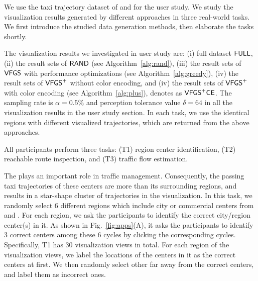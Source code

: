 We use the taxi trajectory dataset of \pt{} and \sz{} for the user study.
We study the visualization results generated by different approaches in three real-world tasks.
We first introduce the studied data generation methods, then elaborate the tasks shortly.

The visualization results we investigated in user study are: (i) full dataset $\mathsf{FULL}$,
(ii) the result sets of $\mathsf{RAND}$ (see Algorithm~\ref{alg:rand}),
(iii) the result sets of $\mathsf{VFGS}$ with performance optimizations (see Algorithm~\ref{alg:greedy}),
(iv) the result sets of $\mathsf{VFGS}^{+}$ without color encoding,
and (iv) the result sets of $\mathsf{VFGS}^{+}$ with color encoding (see Algorithm~\ref{alg:plus}), denotes as $\mathsf{VFGS}^{+}\mathsf{CE}$.
The sampling rate is $\alpha = 0.5\%$ and perception tolerance value $\delta = 64$ in all the visualization results in the user study section.
In each task, we use the identical regions with different visualized trajectories, which are returned from the above approaches.


All participants perform three tasks:  (T1) region center identification, (T2) reachable route inspection, and (T3) traffic flow estimation.

The  plays an important role in traffic management.
Consequently, the passing taxi trajectories of these centers are more than its surrounding regions, and results in a star-shape cluster of trajectories in the visualization.
In this task, we randomly select 6 different regions which include city or commercial centers from \pt{} and \sz{}.
For each region, we ask the participants to identify the correct city/region center(s) in it.
As shown in Fig.~\ref{fig:apps}(A), it asks the participants to identify 3 correct centers among these 6 cycles by clicking the corresponding cycles.
Specifically, T1 has 30 visualization views in total.
For each region of the visualization views,  we label the locations of the  centers in it as the correct centers at first.	We then randomly select other  far away from the correct centers, and label them as incorrect ones.

